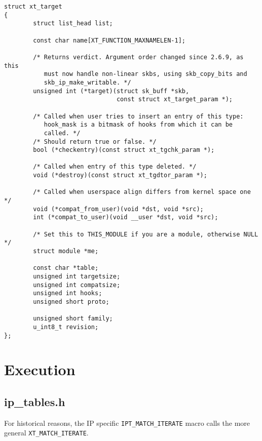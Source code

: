 \documentclass[a4paper,10pt]{article}
\newcommand{\code}[1]{\texttt{#1}}
\begin{document}
\begin{lstlisting}
struct xt_target
{
        struct list_head list;

        const char name[XT_FUNCTION_MAXNAMELEN-1];

        /* Returns verdict. Argument order changed since 2.6.9, as this                                                                                     
           must now handle non-linear skbs, using skb_copy_bits and                                                                                         
           skb_ip_make_writable. */
        unsigned int (*target)(struct sk_buff *skb,
                               const struct xt_target_param *);

        /* Called when user tries to insert an entry of this type:                                                                                          
           hook_mask is a bitmask of hooks from which it can be                                                                                             
           called. */
        /* Should return true or false. */
        bool (*checkentry)(const struct xt_tgchk_param *);

        /* Called when entry of this type deleted. */
        void (*destroy)(const struct xt_tgdtor_param *);

        /* Called when userspace align differs from kernel space one */
        void (*compat_from_user)(void *dst, void *src);
        int (*compat_to_user)(void __user *dst, void *src);

        /* Set this to THIS_MODULE if you are a module, otherwise NULL */
        struct module *me;

        const char *table;
        unsigned int targetsize;
        unsigned int compatsize;
        unsigned int hooks;
        unsigned short proto;

        unsigned short family;
        u_int8_t revision;
};
\end{lstlisting}

\section{Execution}

\subsection{ip\_tables.h}

For historical reasons, the IP specific \code{IPT\_MATCH\_ITERATE}
macro calls the more general \code{XT\_MATCH\_ITERATE}. 
\end{document}
